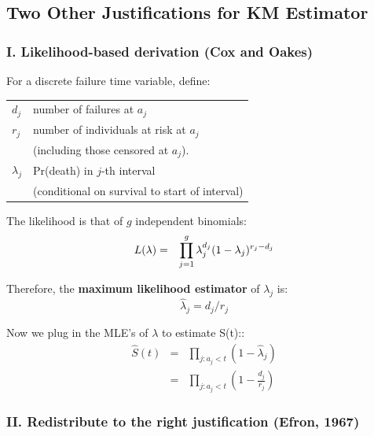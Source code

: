 \documentclass[11pt,slidesonly,semrot,portrait,palatino]{book}
\begin{document}
\subsection{Two Other Justifications for KM Estimator}

\subsubsection{I. Likelihood-based derivation (Cox and Oakes)}

For a discrete failure time variable, define:
\begin{center}
\begin{tabular}{ll}
$d_j$ &  number of failures at $a_j$\\
$r_j$ &  number of individuals at risk at $a_j$ \\
      & (including those  censored at $a_j$).\\
$\lambda_j$ & Pr(death) in $j$-th interval \\
            & (conditional on survival to start of interval)\\
\end{tabular}
\end{center}

The likelihood is that of $g$ independent binomials:
\begin{eqnarray*}
L(\bf \lambda) & = & \prod_{j=1}^g
\lambda_j^{d_j}(1-\lambda_j)^{r_j-d_j}
\end{eqnarray*}

Therefore, the {\bf maximum likelihood estimator} of
$\lambda_j$ is:
 \[\hat{\lambda}_j=d_j/r_j\]

Now we plug in the MLE's of $\lambda$ to estimate S(t)::
\begin{eqnarray*}
\hat{S}(t) & = & \prod_{j:a_j<t}(1-\hat{\lambda}_j)\\[2ex]
 & = & \prod_{j:a_j<t}\left(1-\frac{d_j}{r_j}\right)
\end{eqnarray*}
\subsubsection{II. Redistribute to the right justification (Efron, 1967)}
\end{document}
